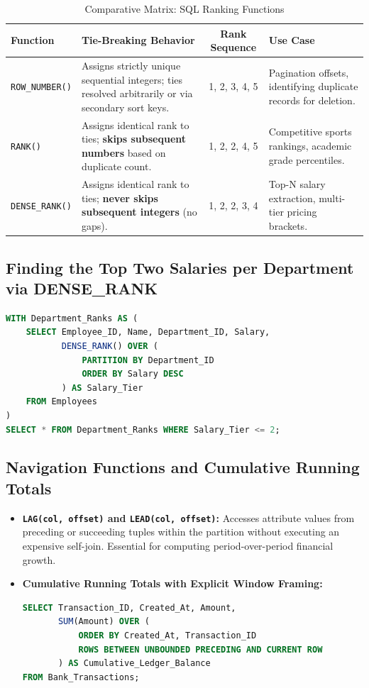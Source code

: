 \begin{table}[htbp]
\centering
\small
\caption{Comparative Matrix: SQL Ranking Functions}
\label{tab:ranking_functions}
\begin{tabularx}{\textwidth}{l p{4.2cm} c X}
\toprule
\textbf{Function} & \textbf{Tie-Breaking Behavior} & \textbf{Rank Sequence} & \textbf{Use Case} \\
\midrule
\texttt{ROW\_NUMBER()} & Assigns strictly unique sequential integers; ties resolved arbitrarily or via secondary sort keys. & 1, 2, 3, 4, 5 & Pagination offsets, identifying duplicate records for deletion. \\
\texttt{RANK()} & Assigns identical rank to ties; \textbf{skips subsequent numbers} based on duplicate count. & 1, 2, 2, 4, 5 & Competitive sports rankings, academic grade percentiles. \\
\texttt{DENSE\_RANK()} & Assigns identical rank to ties; \textbf{never skips subsequent integers} (no gaps). & 1, 2, 2, 3, 4 & Top-N salary extraction, multi-tier pricing brackets. \\
\bottomrule
\end{tabularx}
\end{table}

\subsection{Finding the Top Two Salaries per Department via DENSE\_RANK}
\begin{lstlisting}[language=SQL]
WITH Department_Ranks AS (
    SELECT Employee_ID, Name, Department_ID, Salary,
           DENSE_RANK() OVER (
               PARTITION BY Department_ID 
               ORDER BY Salary DESC
           ) AS Salary_Tier
    FROM Employees
)
SELECT * FROM Department_Ranks WHERE Salary_Tier <= 2;
\end{lstlisting}

\subsection{Navigation Functions and Cumulative Running Totals}
\begin{itemize}
    \item \textbf{\texttt{LAG(col, offset)} and \texttt{LEAD(col, offset)}:} Accesses attribute values from preceding or succeeding tuples within the partition without executing an expensive self-join. Essential for computing period-over-period financial growth.
    \item \textbf{Cumulative Running Totals with Explicit Window Framing:}
\begin{lstlisting}[language=SQL]
SELECT Transaction_ID, Created_At, Amount,
       SUM(Amount) OVER (
           ORDER BY Created_At, Transaction_ID
           ROWS BETWEEN UNBOUNDED PRECEDING AND CURRENT ROW
       ) AS Cumulative_Ledger_Balance
FROM Bank_Transactions;
\end{lstlisting}
\end{itemize}

